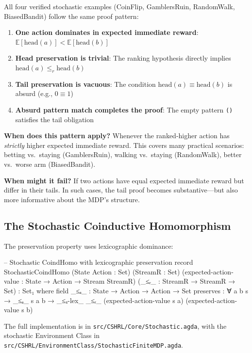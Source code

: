 \documentclass[9pt,a4paper]{article}
\newcommand{\fpath}[1]{\nolinkurl{#1}}
\theoremstyle{plain}
\theoremstyle{definition}
\theoremstyle{remark}
\begin{document}
All four verified stochastic examples (CoinFlip, GamblersRuin, RandomWalk, BiasedBandit) follow the same proof pattern:

\begin{enumerate}
\item \textbf{One action dominates in expected immediate reward}: $\mathbb{E}[\text{head}(a)] < \mathbb{E}[\text{head}(b)]$
\item \textbf{Head preservation is trivial}: The ranking hypothesis directly implies $\text{head}(a) \le_r \text{head}(b)$
\item \textbf{Tail preservation is vacuous}: The condition $\text{head}(a) \equiv \text{head}(b)$ is absurd (e.g., $0 \equiv 1$)
\item \textbf{Absurd pattern match completes the proof}: The empty pattern \texttt{()} satisfies the tail obligation
\end{enumerate}

\noindent\textbf{When does this pattern apply?} Whenever the ranked-higher action has \emph{strictly} higher expected immediate reward. This covers many practical scenarios: betting vs.\ staying (GamblersRuin), walking vs.\ staying (RandomWalk), better vs.\ worse arm (BiasedBandit).

\noindent\textbf{When might it fail?} If two actions have equal expected immediate reward but differ in their tails. In such cases, the tail proof becomes substantive---but also more informative about the MDP's structure.

\subsection{The Stochastic Coinductive Homomorphism}

The preservation property uses lexicographic dominance:

\begin{code}
  -- Stochastic CoindHomo with lexicographic preservation
  record StochasticCoindHomo 
    (State Action : Set) (StreamR : Set)
    (expected-action-value : State → Action → Stream StreamR)
    (_≤ᵣ_ : StreamR → StreamR → Set) : Set₁ where
    field
      _≤ₐ_     : State → Action → Action → Set
      preserves : ∀ a b s → _≤ₐ_ s a b →
                  _≤ₛ-lex_ _≤ᵣ_ (expected-action-value s a) (expected-action-value s b)
\end{code}

\noindent The full implementation is in \fpath{src/CSHRL/Core/Stochastic.agda}, with the stochastic Environment Class in \fpath{src/CSHRL/EnvironmentClass/StochasticFiniteMDP.agda}.
\end{document}
